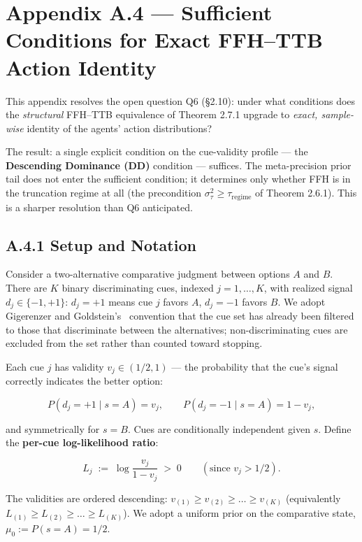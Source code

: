 \documentclass{article}
\begin{document}
\section{Appendix A.4 --- Sufficient Conditions for Exact FFH--TTB
Action
Identity}\label{appendix-a.4-sufficient-conditions-for-exact-ffhttb-action-identity}

This appendix resolves the open question Q6 (\S{}2.10): under what
conditions does the \emph{structural} FFH--TTB equivalence of Theorem
2.7.1 upgrade to \emph{exact, sample-wise} identity of the agents'
action distributions?

The result: a single explicit condition on the cue-validity profile ---
the \textbf{Descending Dominance (DD)} condition --- suffices. The
meta-precision prior tail does not enter the sufficient condition; it
determines only whether FFH is in the truncation regime at all (the
precondition \(\sigma_{\tau}^{2} \geq \tau_{\mathrm{regime}}\) of
Theorem 2.6.1). This is a sharper resolution than Q6 anticipated.

\subsection{A.4.1 Setup and Notation}\label{a.4.1-setup-and-notation}

Consider a two-alternative comparative judgment between options \(A\)
and \(B\). There are \(K\) binary discriminating cues, indexed
\(j = 1, \ldots, K\), with realized signal \(d_{j} \in \{-1, +1\}\):
\(d_{j} = +1\) means cue \(j\) favors \(A\), \(d_{j} = -1\) favors
\(B\). We adopt Gigerenzer and Goldstein's~\cite{gigerenzer1996} convention that the
cue set has already been filtered to those that discriminate between the
alternatives; non-discriminating cues are excluded from the set rather
than counted toward stopping.

Each cue \(j\) has validity \(v_{j} \in (1/2, 1)\) --- the probability
that the cue's signal correctly indicates the better option:

\[
P(d_{j} = +1 \mid s = A) = v_{j}, \qquad P(d_{j} = -1 \mid s = A) = 1 - v_{j},
\]

and symmetrically for \(s = B\). Cues are conditionally independent
given \(s\). Define the \textbf{per-cue log-likelihood ratio}:

\[
L_{j} \;:=\; \log \frac{v_{j}}{1 - v_{j}} \;>\; 0 \qquad (\text{since } v_{j} > 1/2).
\]

The validities are ordered descending:
\(v_{(1)} \geq v_{(2)} \geq \ldots \geq v_{(K)}\) (equivalently
\(L_{(1)} \geq L_{(2)} \geq \ldots \geq L_{(K)}\)). We adopt a uniform
prior on the comparative state, \(\mu_{0} := P(s = A) = 1/2\).
\end{document}
